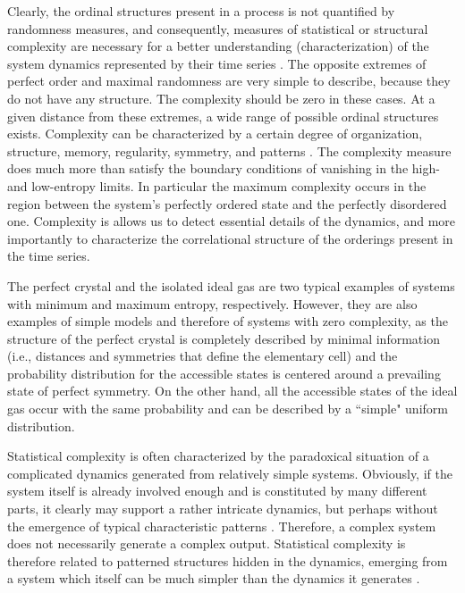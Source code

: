 Clearly, the ordinal structures present in a process is not quantified by randomness measures, 
and consequently, measures of statistical or structural complexity are necessary for a better understanding 
(characterization) of the system dynamics represented by their time series \cite{Crutchfield1998}. 
The opposite extremes of perfect order and maximal randomness are very simple to describe, because they do 
not have any structure. 
The complexity should be zero in these cases. 
At a given distance from these extremes, a wide range of possible ordinal structures exists. 
Complexity can be characterized by a certain degree of organization, structure, memory, regularity, symmetry, 
and patterns \cite{Feldman2008}. 
The complexity measure does much more than satisfy the boundary conditions of vanishing in the high- and 
low-entropy limits. 
In particular the maximum complexity occurs in the region between the system's perfectly ordered state and 
the perfectly disordered one. 
Complexity is allows us to detect essential details of the dynamics, and more importantly to characterize 
the correlational structure of the orderings present in the time series.


The perfect crystal and the isolated ideal gas are two typical examples of systems with minimum and 
maximum entropy, respectively. 
However, they are also examples of simple models and therefore of systems with zero complexity, as the
structure of the perfect crystal is completely described by minimal information (i.e., distances and 
symmetries that define the elementary cell) and the probability distribution for the accessible states 
is centered around a prevailing state of perfect symmetry. 
On the other hand, all the accessible states of the ideal gas occur with the same probability and can be
described by a ``simple" uniform distribution. 

Statistical complexity is often characterized by the paradoxical situation of a complicated dynamics 
generated from relatively simple systems. 
Obviously, if the system itself is already involved enough and is constituted by many different parts, 
it clearly may support a rather intricate dynamics, but perhaps without the emergence of typical 
characteristic patterns \cite{Kantz1998}. 
Therefore, a complex system does not necessarily generate a complex output. 
Statistical complexity is therefore related to patterned structures hidden in the dynamics,
emerging from a system which itself can be much simpler than the dynamics it generates \cite{Kantz1998}.


